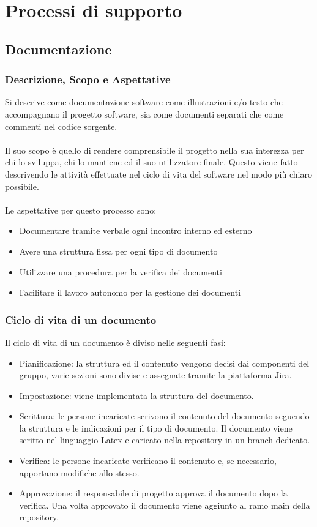 \documentclass{article}
\begin{document}
\section{Processi di supporto}

\subsection{Documentazione}
\subsubsection{Descrizione, Scopo e Aspettative }
Si descrive come documentazione software come illustrazioni e/o testo che accompagnano il progetto software, sia come documenti separati che come commenti nel codice sorgente.\\ \\
Il suo scopo è quello di rendere comprensibile il progetto nella sua interezza per chi lo sviluppa, chi lo mantiene ed il suo utilizzatore finale. Questo viene fatto descrivendo le attività effettuate nel ciclo di vita del software nel modo più chiaro possibile.\\ \\
Le aspettative per questo processo sono:
\begin{itemize}
    \item Documentare tramite verbale ogni incontro interno ed esterno
    \item Avere una struttura fissa per ogni tipo di documento
    \item Utilizzare una procedura per la verifica dei documenti
    \item Facilitare il lavoro autonomo per la gestione dei documenti
\end{itemize}

\subsubsection{Ciclo di vita di un documento} \label{cicloDoc}
Il ciclo di vita di un documento è diviso nelle seguenti fasi:
\begin{itemize}
    \item Pianificazione: la struttura ed il contenuto vengono decisi dai componenti del gruppo, varie sezioni sono divise e assegnate tramite la piattaforma Jira.
    \item Impostazione: viene implementata la struttura del documento.
    \item Scrittura: le persone incaricate scrivono il contenuto del documento seguendo la struttura e le indicazioni per il tipo di documento. Il documento viene scritto nel linguaggio Latex e caricato nella repository in un branch dedicato.
    \item Verifica: le persone incaricate verificano il contenuto e, se necessario, apportano modifiche allo stesso.
    \item Approvazione: il responsabile di progetto approva il documento dopo la verifica. Una volta approvato il documento viene aggiunto al ramo main della repository.
\end{itemize}
\end{document}
